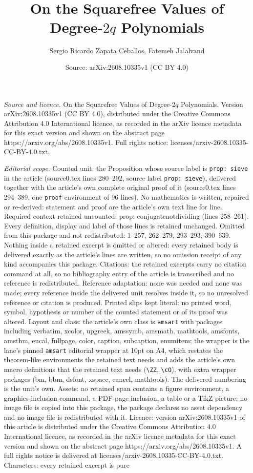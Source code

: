 \documentclass[10pt,a4paper]{amsart}
\title[On the Squarefree Values of Degree-$2q$ Polynomials]{On the Squarefree Values of Degree-$2q$ Polynomials}
\author{Sergio Ricardo Zapata Ceballos, Fatemeh Jalalvand}
\date{Source: arXiv:2608.10335v1 (CC BY 4.0)}
\begin{document}
\maketitle

\noindent\emph{Source and licence.} On the Squarefree Values of Degree-$2q$ Polynomials. Version arXiv:2608.10335v1 (CC BY 4.0), distributed under the Creative Commons Attribution 4.0 International licence, as recorded in the arXiv licence metadata for this exact version and shown on the abstract page https://arxiv.org/abs/2608.10335v1. Full rights notice: licenses/arxiv-2608.10335-CC-BY-4.0.txt.\par\smallskip

\noindent\textit{Editorial scope.} Counted unit: the Proposition whose source label is \texttt{prop: sieve} in the article (source0.tex lines 280--292, source label \texttt{prop: sieve}), delivered together with the article's own complete original proof of it (source0.tex lines 294--389, one \texttt{proof} environment of 96 lines). No mathematics is written, repaired or re-derived: statement and proof are the article's own text line for line. Required context retained uncounted: prop: conjugatenotdividing (lines 258--261). Every definition, display and label of those lines is retained unchanged. Omitted from this package and not redistributed: 1--257, 262--279, 293--293, 390--639. Nothing inside a retained excerpt is omitted or altered: every retained body is delivered exactly as the article's lines are written, so no omission receipt of any kind accompanies this package. Citations: the retained excerpts carry no citation command at all, so no bibliography entry of the article is transcribed and no reference is redistributed. Reference adaptation: none was needed and none was made; every reference inside the delivered unit resolves inside it, so no unresolved reference or citation is produced. Printed slips kept literal: no printed word, symbol, hypothesis or number of the counted statement or of its proof was altered. Layout and class: the article's own class is \texttt{amsart} with packages including verbatim, xcolor, upgreek, amssymb, amsmath, mathtools, amsfonts, amsthm, eucal, fullpage, color, caption, subcaption, enumitem; the wrapper is the lane's pinned \texttt{amsart} editorial wrapper at 10pt on A4, which restates the theorem-like environments the retained text needs and adds the article's own macro definitions that the retained text needs (\texttt{\textbackslash ZZ}, \texttt{\textbackslash cO}), with extra wrapper packages (bm, bbm, dsfont, xspace, cancel, mathtools). The delivered numbering is the unit's own. Assets: no retained span contains a figure environment, a graphics-inclusion command, a PDF-page inclusion, a table or a TikZ picture; no image file is copied into this package, the package declares no asset dependency and no image file is redistributed with it. Licence: version arXiv:2608.10335v1 of this article is distributed under the Creative Commons Attribution 4.0 International licence, as recorded in the arXiv licence metadata for this exact version and shown on the abstract page https://arxiv.org/abs/2608.10335v1. A full rights notice is delivered at licenses/arxiv-2608.10335-CC-BY-4.0.txt. Characters: every retained excerpt is pure 
\end{document}
